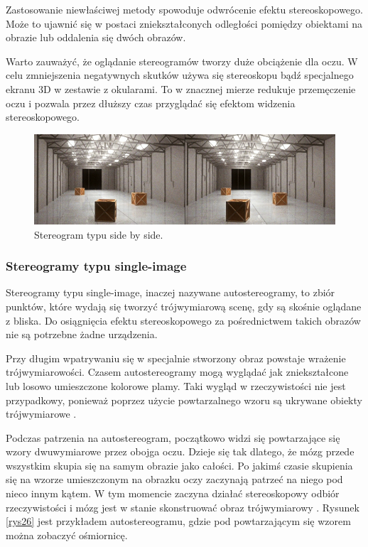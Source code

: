 Zastosowanie niewłaściwej metody spowoduje odwrócenie efektu stereoskopowego. Może to ujawnić się w postaci zniekształconych odległości pomiędzy obiektami na obrazie lub oddalenia się dwóch obrazów.

Warto zauważyć, że oglądanie stereogramów tworzy duże obciążenie dla oczu. W celu zmniejszenia negatywnych skutków używa się stereoskopu bądź specjalnego ekranu 3D w zestawie z okularami. To w znacznej mierze redukuje przemęczenie oczu i pozwala przez dłuższy czas przyglądać się efektom widzenia stereoskopowego.
\begin{figure}[H]
		\centering
 		\includegraphics[width=13.5cm]{sbs.jpg}
    	\caption{Stereogram typu side by side\cite{sidebyside}.}
 		\label{rys1}
\end{figure}

\subsubsection{Stereogramy typu single-image} 
Stereogramy typu single-image, inaczej nazywane autostereogramy, to zbiór punktów, które wydają się tworzyć trójwymiarową scenę, gdy są skośnie oglądane z bliska. Do osiągnięcia efektu stereoskopowego za pośrednictwem takich obrazów nie są potrzebne żadne urządzenia.

Przy długim wpatrywaniu się w specjalnie stworzony obraz powstaje wrażenie trójwymiarowości. Czasem autostereogramy mogą wyglądać jak zniekształcone lub losowo umieszczone kolorowe plamy. Taki wygląd w rzeczywistości nie jest przypadkowy, ponieważ poprzez użycie powtarzalnego wzoru są ukrywane obiekty trójwymiarowe \cite{stereoscopythesis}.

Podczas patrzenia na autostereogram, początkowo widzi się powtarzające się wzory dwuwymiarowe przez obojga oczu. Dzieje się tak dlatego, że mózg przede wszystkim skupia się na samym obrazie jako całości. Po jakimś czasie skupienia się na wzorze umieszczonym na obrazku oczy zaczynają patrzeć na niego pod nieco innym kątem. W tym momencie zaczyna działać stereoskopowy odbiór rzeczywistości i mózg jest w stanie skonstruować obraz trójwymiarowy \cite{autostereogramInfo}. Rysunek \ref{rys26} jest przykładem autostereogramu, gdzie pod powtarzającym się wzorem można zobaczyć ośmiornicę.

